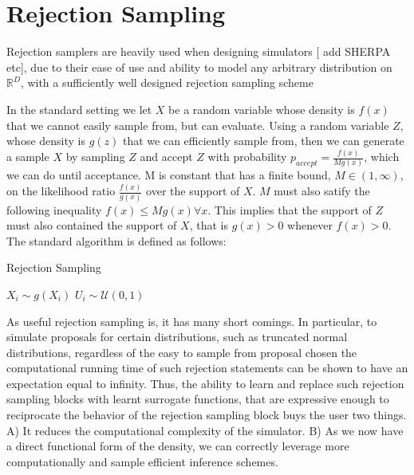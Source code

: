 \documentclass{article}
\begin{document}
\section{Rejection Sampling}

Rejection samplers are heavily used when designing simulators [ add SHERPA etc], due to their ease of use and ability to model 
any arbitrary distribution on $\mathbb{R}^{D}$, with a sufficiently well designed rejection sampling scheme~\cite{MEYER20083408,martino2012improved,casella} 

In the standard setting we let $X$ be a random variable whose density is $f(x)$ that we cannot easily 
sample from, but can evaluate. Using a random variable $Z$, whose density is $g(z)$  that we can efficiently
sample from, then we can generate a sample $X$ by sampling $Z$ and accept $Z$ with probability
$p_{accept} = \frac{f(x)}{Mg(x)}$, which we can do until acceptance. 
M is constant that has a finite bound, $M \in (1, \infty)$, on the likelihood ratio $\frac{f(x)}{g(x)}$ over the 
support of $X$. $M$ must also satify the following inequality $f(x) \leq M g(x)  \forall x$. 
This implies that the support of $Z$ must also contained the support of $X$, that is
$g(x) > 0$ whenever $f(x)>0$. 
The standard algorithm is defined as follows:
\begin{algorithm}
  \small
   \caption{Rejection Sampling}
    \begin{algorithmic}\small
       \State $X_{i} \sim g(X_{i})$ 
       \State $U_{i} \sim \mathcal{U}(0,1)$
       \Else
       \EndIf
\end{algorithmic}
\end{algorithm}

As useful rejection sampling is, it has many short comings. 
In particular, to simulate proposals for certain distributions,
such as truncated normal distributions, regardless of the easy to sample from proposal
chosen the computational running time of such rejection statements can be shown to have an
expectation equal to infinity. Thus, the ability to learn and replace such rejection
sampling blocks with learnt surrogate functions, that are expressive enough to 
reciprocate the behavior of the rejection sampling block buys the user two things. 
A) It reduces the computational complexity of the simulator. 
B) As we now have a direct functional form of the density, we can correctly leverage
more computationally and sample efficient inference schemes. 
\end{document}

